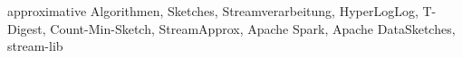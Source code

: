 approximative Algorithmen, Sketches, Streamverarbeitung, HyperLogLog, T-Digest, Count-Min-Sketch, StreamApprox, Apache Spark, Apache DataSketches, stream-lib
